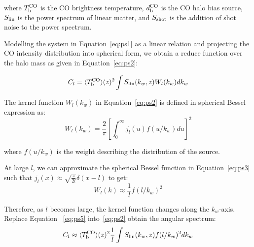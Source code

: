 \noindent where $T_{\rm b}^{\rm CO}$ is the CO brightness temperature, $d_{\rm b}^{\rm CO}$ is the CO halo bias source, $S_{\rm lin}$ is the power spectrum of linear matter,
and $S_{\rm shot}$ is the addition of shot noise to the power spectrum.

Modelling the system in Equation~\ref{eq:ps1} as a linear relation and projecting the CO intensity distribution into spherical form, we obtain a reduce function 
over the halo mass as given in Equation~\ref{eq:ps2}:

\begin{equation}  \label{eq:ps2}
 C_{l} = \langle T_{\rm b}^{\rm CO} \rangle (z)^{2}\int S_{\rm lin}(k_{w},z)W_{l}(k_{w}) dk_{w}
\end{equation}

\noindent  The kernel function $W_{l}(k_{w})$ in Equation~\ref{eq:ps2} is defined in spherical Bessel expression as:
\begin{equation}  \label{eq:ps3}
 W_{l}(k_{w}) = \frac{2}{\pi}\left[ \int_{0}^{\infty}  j_{l}(u) f(u/k_{w}) du \right]^2
\end{equation}

\noindent  where  $f(u/k_{w})$ is the weight describing the  distribution of the source. 
% 


\noindent At large $l$, we can approximate the spherical Bessel function in Equation~\ref{eq:ps3} such that $j_{l}(x) \approx \sqrt{\frac{\pi}{2l}} \delta(x-l)$ to get:
\begin{equation}  \label{eq:ps5}
 W_{l}(k) \approx \frac{1}{l} f(l/k_{w})^2
\end{equation}

\noindent  Therefore, as $l$ becomes large, the kernel function changes along the $k_{w}$-axis. Replace  Equation ~\ref{eq:ps5} into~\ref{eq:ps2} obtain the angular spectrum:
\begin{equation}  \label{eq:ps6}
 C_{l} \approx \langle T_{\rm b}^{\rm CO} \rangle (z)^{2}\frac{1}{l} \int S_{\rm lin}(k_{w},z)f(l/k_{w})^2 dk_{w}
\end{equation}


